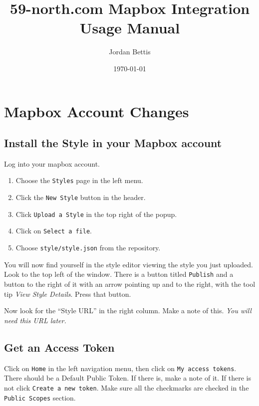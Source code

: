 \documentclass[11pt]{article}
\title{59-north.com Mapbox Integration Usage Manual}
\author{Jordan Bettis}
\date{\today{}}
\begin{document}
\maketitle
\tableofcontents

\newpage

\section{Mapbox Account Changes}

\subsection{Install the Style in your Mapbox account}

Log into your mapbox account.

\begin{enumerate}
\item Choose the \texttt{Styles} page in the left menu.
\item Click the \texttt{New Style} button in the header.
\item Click \texttt{Upload a Style} in the top right of the popup.
\item Click on \texttt{Select a file}.
\item Choose \texttt{style/style.json} from the repository.

\end{enumerate}

You will now find yourself in the style editor viewing the style you
just uploaded. Look to the top left of the window. There is a button
titled \texttt{Publish} and a button to the right of it with an arrow
pointing up and to the right, with the tool tip \emph{View Style
  Details}. Press that button.

Now look for the ``Style URL'' in the right column. Make a note of
this. \emph{You will need this URL later.}

\label{style-url}

\subsection{Get an Access Token}

Click on \texttt{Home} in the left navigation menu, then click on
\texttt{My access tokens}. There should be a Default Public Token. If
there is, make a note of it. If there is not click \texttt{Create a
  new token}. Make sure all the checkmarks are checked in the
\texttt{Public Scopes} section.
\end{document}
